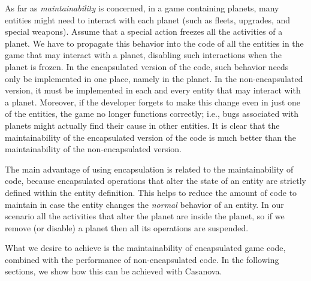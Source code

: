 As far as \emph{maintainability} is concerned, in a game containing planets, many entities might need to interact with each planet (such as fleets, upgrades, and special weapons). Assume that a special action freezes all the activities of a planet. We have to propagate this behavior into the code of all the entities in the game that may interact with a planet, disabling such interactions when the planet is frozen. In the encapsulated version of the code, such behavior needs only be implemented in one place, namely in the planet. In the non-encapsulated version, it must be implemented in each and every entity that may interact with a planet. Moreover, if the developer forgets to make this change even in just one of the entities, the game no longer functions correctly; i.e., bugs associated with planets might actually find their cause in other entities. It is clear that the maintainability of the encapsulated version of the code is much better than the maintainability of the non-encapsulated version.

The main advantage of using encapsulation is related to the maintainability of code, because encapsulated operations that alter the state of an entity are strictly defined within the entity definition. This helps to reduce the amount of code to maintain in case the entity changes the \textit{normal} behavior of an entity. In our scenario all the activities that alter the planet are inside the planet, so if we remove (or disable) a planet then all its operations are suspended.

What we desire to achieve is the maintainability of encapsulated game code, combined with the performance of non-encapsulated code. In the following sections, we show how this can be achieved with Casanova. 
